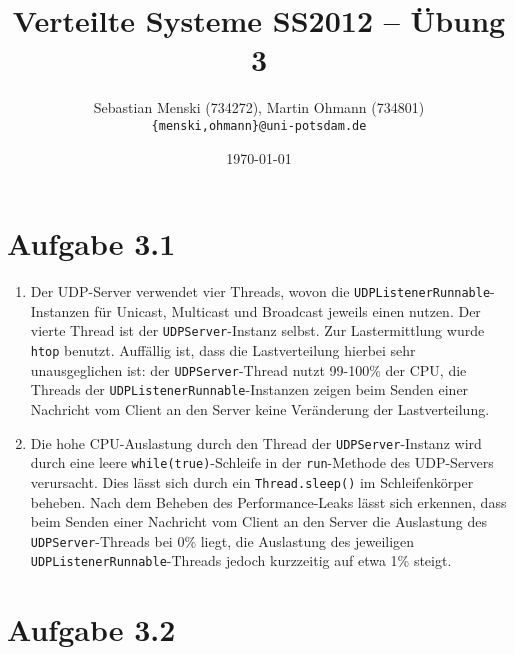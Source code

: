 \documentclass[german,12pt,a4paper]{article}
\begin{document}
\title{\textbf{Verteilte Systeme SS2012 -- Übung 3}}
\author{Sebastian Menski (734272), Martin Ohmann (734801) \\ \texttt{\{menski,ohmann\}@uni-potsdam.de}}
\date{\today}

\maketitle

\section*{Aufgabe 3.1}

\begin{enumerate}

	\item Der UDP-Server verwendet vier Threads, wovon die \texttt{UDPListenerRunnable}-Instanz\-en für Unicast, Multicast und Broadcast jeweils einen nutzen.
	Der vierte Thread ist der \texttt{UDPServer}-Instanz selbst. Zur Lastermittlung wurde \texttt{htop} benutzt. Auffällig ist, dass die Lastverteilung hierbei 
	sehr unausgeglichen ist: der \texttt{UDPServer}-Thread nutzt 99-100\% 
	der CPU, die Threads der \texttt{UDPListenerRunnable}-Instanzen zeigen beim Senden einer Nachricht vom Client an den Server keine Veränderung der Lastverteilung.
	
	\item Die hohe CPU-Auslastung durch den Thread der \texttt{UDPServer}-Instanz wird durch eine leere \texttt{while(true)}-Schleife in der \texttt{run}-Methode des UDP-Servers verursacht. 
	Dies lässt sich durch ein \texttt{Thread.sleep()} im Schleifenkörper beheben. Nach dem Beheben des Performance-Leaks lässt sich erkennen, dass beim Senden einer Nachricht vom Client an den Server die Auslastung des \texttt{UDPServer}-Threads bei 
	0\% liegt, die Auslastung des jeweiligen \texttt{UDPListenerRunnable}-Threads jedoch kurzzeitig auf etwa 1\% steigt.

\end{enumerate}

\section*{Aufgabe 3.2}
\end{document}
